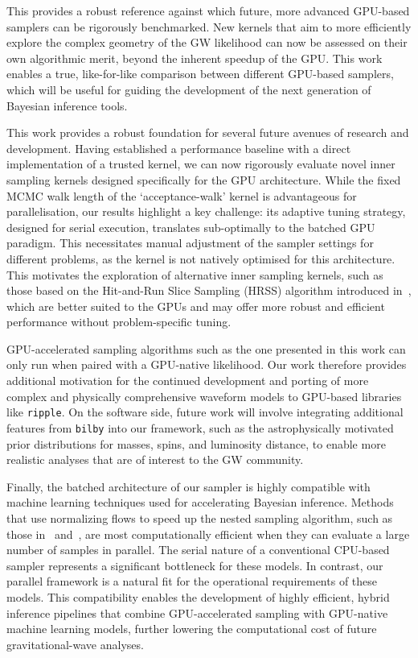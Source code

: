 \documentclass[fleqn,usenatbib]{mnras}
\begin{document}
This provides a robust reference against which future, more advanced
GPU-based samplers can be rigorously benchmarked. New kernels that
aim to more efficiently explore the complex geometry of the GW
likelihood can now be assessed on their own algorithmic merit, beyond
the inherent speedup of the GPU. This work enables a true,
like-for-like comparison between different GPU-based samplers, 
which will be useful for guiding the development
of the next generation of Bayesian inference tools.

This work provides a robust foundation for several future avenues of
research and development. Having established a performance baseline with a
direct implementation of a trusted kernel, we can now rigorously
evaluate novel inner sampling kernels designed specifically for the GPU
architecture. While the fixed MCMC walk length of the `acceptance-walk'
kernel is advantageous for parallelisation, our results highlight a key
challenge: its adaptive tuning strategy, designed for serial execution,
translates sub-optimally to the batched GPU paradigm. This necessitates
manual adjustment of the sampler settings for different problems,
as the kernel is not natively optimised for this
architecture. This motivates the exploration of alternative inner
sampling kernels, such as those based on the Hit-and-Run Slice Sampling
(HRSS) algorithm introduced in~\cite{yallup2025nested}, which are
better suited to the GPUs and may offer
more robust and efficient performance without problem-specific tuning.

GPU-accelerated sampling algorithms such as the one presented in this work can only run when
paired with a GPU-native likelihood. Our work therefore provides additional motivation for the continued development
and porting of more complex and physically comprehensive waveform models
to GPU-based libraries like \texttt{ripple}. On the software side, future
work will involve integrating additional features from \texttt{bilby}
into our framework, such as the astrophysically motivated prior
distributions for masses, spins, and luminosity distance, to enable 
more realistic analyses that are of interest to the GW community.

Finally, the batched architecture of our sampler is highly compatible
with machine learning techniques used for accelerating Bayesian
inference. Methods that use normalizing flows to speed up
the nested sampling algorithm, such as those in~\cite{Williams2021Nessai} and~\cite{Prathaban}, are most
computationally efficient when they can evaluate a large number of
samples in parallel. The serial nature of a conventional CPU-based
sampler represents a significant bottleneck for these models. In
contrast, our parallel framework is a natural fit for the operational 
requirements of these models. This compatibility enables the development of highly efficient,
hybrid inference pipelines that combine GPU-accelerated sampling with
GPU-native machine learning models, further lowering the computational
cost of future gravitational-wave analyses.
\end{document}
